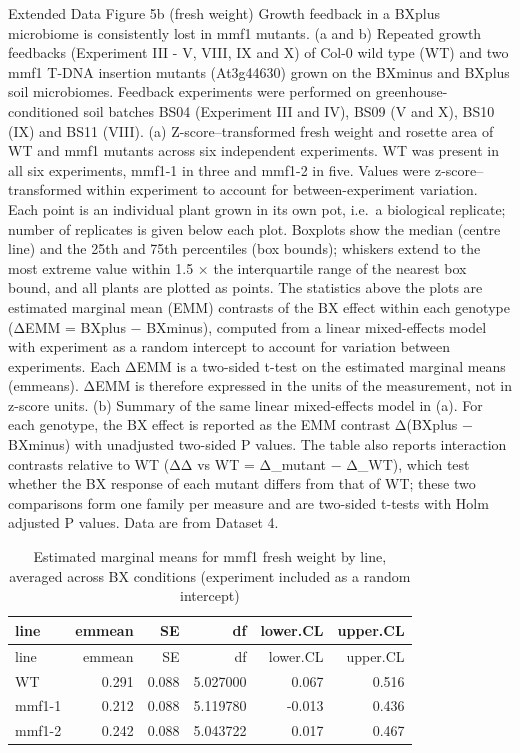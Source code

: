 \documentclass[
  10pt,
]{article}
\begin{document}
Extended Data Figure 5b (fresh weight) \textbar{} Growth feedback in a
BXplus microbiome is consistently lost in mmf1 mutants. (a and b)
Repeated growth feedbacks (Experiment III - V, VIII, IX and X) of Col-0
wild type (WT) and two mmf1 T-DNA insertion mutants (At3g44630) grown on
the BXminus and BXplus soil microbiomes. Feedback experiments were
performed on greenhouse-conditioned soil batches BS04 (Experiment III
and IV), BS09 (V and X), BS10 (IX) and BS11 (VIII). (a)
Z-score--transformed fresh weight and rosette area of WT and mmf1
mutants across six independent experiments. WT was present in all six
experiments, mmf1-1 in three and mmf1-2 in five. Values were
z-score--transformed within experiment to account for between-experiment
variation. Each point is an individual plant grown in its own pot,
i.e.~a biological replicate; number of replicates is given below each
plot. Boxplots show the median (centre line) and the 25th and 75th
percentiles (box bounds); whiskers extend to the most extreme value
within 1.5 × the interquartile range of the nearest box bound, and all
plants are plotted as points. The statistics above the plots are
estimated marginal mean (EMM) contrasts of the BX effect within each
genotype (ΔEMM = BXplus − BXminus), computed from a linear mixed-effects
model with experiment as a random intercept to account for variation
between experiments. Each ΔEMM is a two-sided t-test on the estimated
marginal means (emmeans). ΔEMM is therefore expressed in the units of
the measurement, not in z-score units. (b) Summary of the same linear
mixed-effects model in (a). For each genotype, the BX effect is reported
as the EMM contrast Δ(BXplus − BXminus) with unadjusted two-sided P
values. The table also reports interaction contrasts relative to WT (ΔΔ
vs WT = Δ\_mutant − Δ\_WT), which test whether the BX response of each
mutant differs from that of WT; these two comparisons form one family
per measure and are two-sided t-tests with Holm adjusted P values. Data
are from Dataset 4.

\begin{longtable}[]{@{}lrrrrr@{}}
\caption{Estimated marginal means for mmf1 fresh weight by line,
averaged across BX conditions (experiment included as a random
intercept)}\tabularnewline
\toprule\noalign{}
line & emmean & SE & df & lower.CL & upper.CL \\
\midrule\noalign{}
\endfirsthead
\toprule\noalign{}
line & emmean & SE & df & lower.CL & upper.CL \\
\midrule\noalign{}
\endhead
\bottomrule\noalign{}
\endlastfoot
WT & 0.291 & 0.088 & 5.027000 & 0.067 & 0.516 \\
mmf1-1 & 0.212 & 0.088 & 5.119780 & -0.013 & 0.436 \\
mmf1-2 & 0.242 & 0.088 & 5.043722 & 0.017 & 0.467 \\
\end{longtable}
\end{document}
